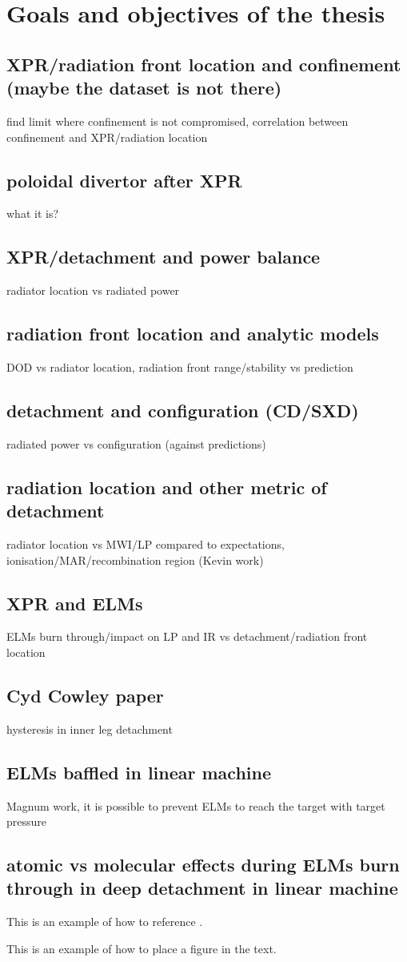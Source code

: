 \section{Goals and objectives of the thesis}

\subsection{XPR/radiation front location and confinement (maybe the dataset is not there)}
find limit where confinement is not compromised, correlation between confinement and XPR/radiation location
\subsection{poloidal divertor after XPR}
what it is?
\subsection{XPR/detachment and power balance}
radiator location vs radiated power
\subsection{radiation front location and analytic models}
DOD vs radiator location, radiation front range/stability vs prediction
\subsection{detachment and configuration (CD/SXD)}
radiated power vs configuration (against predictions)
\subsection{radiation location and other metric of detachment}
radiator location vs MWI/LP compared to expectations, ionisation/MAR/recombination region (Kevin work)
\subsection{XPR and ELMs}
ELMs burn through/impact on LP and IR vs detachment/radiation front location
\subsection{Cyd Cowley paper}
hysteresis in inner leg detachment
\subsection{ELMs baffled in linear machine}
Magnum work, it is possible to prevent ELMs to reach the target with target pressure
\subsection{atomic vs molecular effects during ELMs burn through in deep detachment in linear machine}



This is an example of how to reference \cite{VanEck2018}.

This is an example of how to place a figure in the text.


